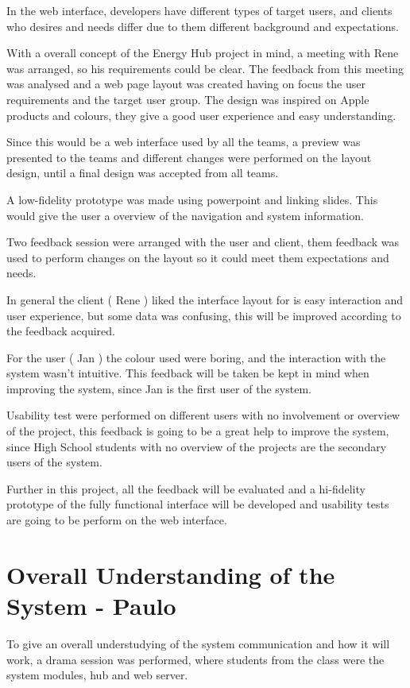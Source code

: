 In the web interface, developers have different types of target users, and clients who desires and needs differ due to them different background and expectations. 

With a overall concept of the Energy Hub project in mind, a meeting with Rene was arranged, so his requirements could be clear. The feedback from this meeting was analysed and a web page layout was created having on focus the user requirements and the target user group. The design was inspired on Apple products and colours, they give a good user experience and easy understanding.

Since this would be a web interface used by all the teams, a preview was presented to the teams and different changes were performed on the layout design, until a final design was accepted from all teams. 

A low-fidelity prototype was made using powerpoint and linking slides. This would give the user a overview of the navigation and system information.

Two feedback session were arranged with the user and client, them feedback was used to perform changes on the layout so it could meet them expectations and needs.

In general the client ( Rene ) liked the interface layout for is easy interaction and user experience, but some data was confusing, this will be improved according to the feedback acquired.

For the user ( Jan ) the colour used were boring, and the interaction with the system wasn't intuitive. This feedback will be taken be kept in mind when improving the system, since Jan is the first user of the system.

Usability test were performed on different users with no involvement or overview of the project, this feedback is going to be a great help to improve the system, since High School students with no overview of the projects are the secondary users of the system.

Further in this project, all the feedback will be evaluated and a hi-fidelity prototype of the fully functional interface will be developed and usability tests are going to be perform on the web interface.

\section{Overall Understanding of the System - Paulo} 

To give an overall understudying of the system communication and how it will work, a drama session was performed, where students from the class were the system modules, hub and web server.

